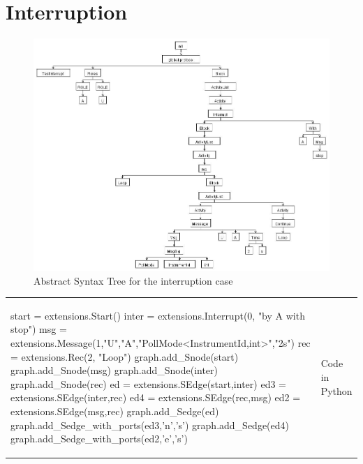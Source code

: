 \documentclass[a4paper,11pt,twoside]{report}
\begin{document}
\section{Interruption}
\begin{figure}[h]
\begin{center}
\includegraphics[width=18cm]{interruptAST}\caption{Abstract Syntax Tree for the interruption case}
\end{center}
\label{fig:InterruptAST}
\end{figure}
\begin{tabular}{ll}
\begin{SJLISTING}
start = extensions.Start()
inter = extensions.Interrupt(0, "by A with stop")
msg = extensions.Message(1,"U","A","PollMode<InstrumentId,int>","2s")
rec = extensions.Rec(2, "Loop")
graph.add_Snode(start)
graph.add_Snode(msg)
graph.add_Snode(inter)
graph.add_Snode(rec)
ed = extensions.SEdge(start,inter)
ed3 = extensions.SEdge(inter,rec)
ed4 = extensions.SEdge(rec,msg)
ed2 = extensions.SEdge(msg,rec)
graph.add_Sedge(ed)
graph.add_Sedge_with_ports(ed3,'n','s')
graph.add_Sedge(ed4)
graph.add_Sedge_with_ports(ed2,'e','s')
\end{SJLISTING}
&  Code in Python
\end{tabular}
\end{document}
